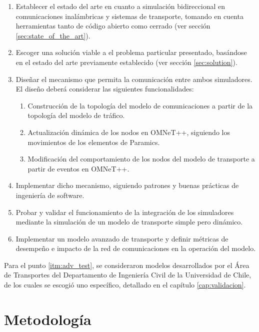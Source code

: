 \begin{enumerate}
    \item Establecer el estado del arte en cuanto a simulación bidireccional en comunicaciones inalámbricas y sistemas de transporte, tomando en cuenta herramientas tanto de código abierto como cerrado (ver sección \ref{sec:state_of_the_art}).
    \item Escoger una solución viable a el problema particular presentado, basándose en el estado del arte previamente establecido (ver sección \ref{sec:solution}).
    \item Diseñar el mecanismo que permita la comunicación entre ambos simuladores.\\
    El diseño deberá considerar las siguientes funcionalidades:
    \begin{enumerate}
        \item Construcción de la topología del modelo de comunicaciones a partir de la topología del modelo de tráfico.
        \item Actualización dinámica de los nodos en OMNeT++, siguiendo los movimientos de los elementos de Paramics.
        \item Modificación del comportamiento de los nodos del modelo de transporte a partir de eventos en OMNeT++.
    \end{enumerate}
    \item Implementar dicho mecanismo, siguiendo patrones y buenas prácticas de ingeniería de software.
    \item \label{itm:simple_test} Probar y validar el funcionamiento de la integración de los simuladores mediante la simulación de un modelo de transporte simple pero dinámico.
    
    \item \label{itm:adv_test} Implementar un modelo avanzado de transporte y definir métricas de desempeño e impacto de la red de comunicaciones en la operación del modelo.
\end{enumerate}

Para el punto \ref{itm:adv_test}, se consideraron modelos desarrollados por el Área de Transportes del Departamento de Ingeniería Civil de la Universidad de Chile, de los cuales se escogió uno específico, detallado en el capítulo \ref{cap:validacion}.

\section{Metodología}

